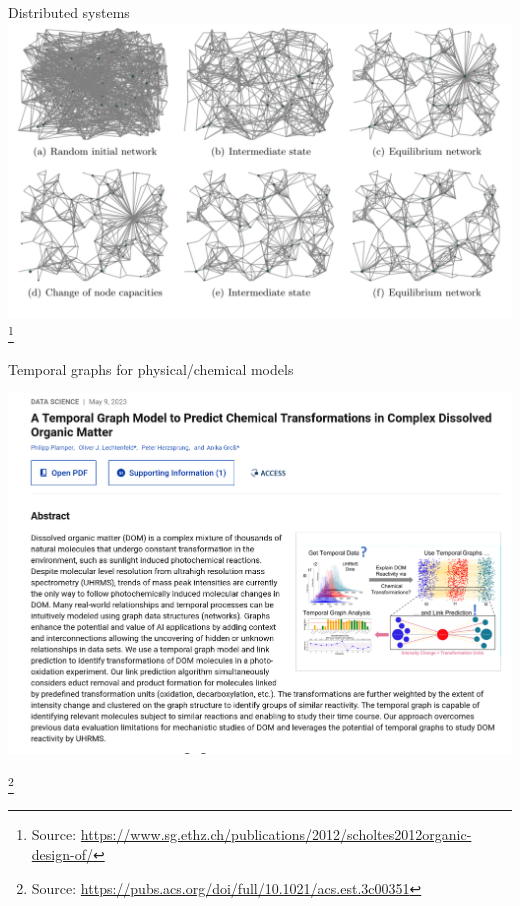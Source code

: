 \documentclass{beamer}
\newcommand{\sourcefootnote}[1]{\let\thefootnote\relax\footnote{{\tiny Source: \url{#1}}}}
\begin{document}
\begin{frame}{Distributed systems}
  \includegraphics[width=\linewidth]{media/massive_distributed_system.png}
  \sourcefootnote{https://www.sg.ethz.ch/publications/2012/scholtes2012organic-design-of/}
\end{frame}

\begin{frame}{Temporal graphs for physical/chemical models}
  \begin{center}
  \includegraphics[width=0.8\linewidth]{media/organic_chemistry.png}
  \end{center}
  \sourcefootnote{https://pubs.acs.org/doi/full/10.1021/acs.est.3c00351}
\end{frame}
\end{document}
